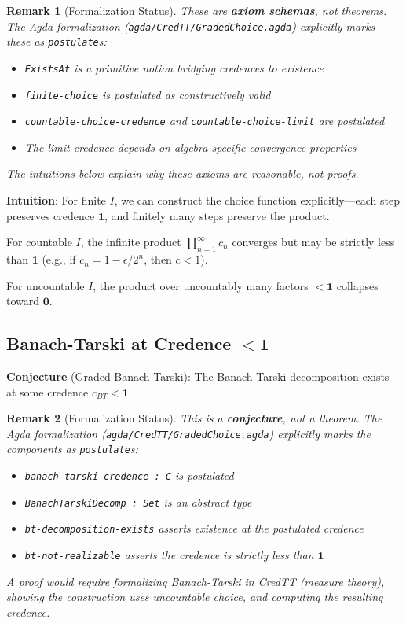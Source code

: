 \documentclass[11pt,a4paper]{article}
\newtheorem{remark}{Remark}[section]
\newcommand{\one}{\mathbf{1}}
\newcommand{\zero}{\mathbf{0}}
\begin{document}
\begin{remark}[Formalization Status]
These are \textbf{axiom schemas}, not theorems. The Agda formalization (\texttt{agda/CredTT/GradedChoice.agda}) explicitly marks these as \texttt{postulate}s:
\begin{itemize}
    \item \texttt{ExistsAt} is a primitive notion bridging credences to existence
    \item \texttt{finite-choice} is postulated as constructively valid
    \item \texttt{countable-choice-credence} and \texttt{countable-choice-limit} are postulated
    \item The limit credence depends on algebra-specific convergence properties
\end{itemize}
The intuitions below explain \emph{why} these axioms are reasonable, not proofs.
\end{remark}

\textbf{Intuition}:
For finite $I$, we can construct the choice function explicitly---each step preserves credence $\one$, and finitely many steps preserve the product.

For countable $I$, the infinite product $\prod_{n=1}^\infty c_n$ converges but may be strictly less than $\one$ (e.g., if $c_n = 1 - \epsilon/2^n$, then $c < 1$).

For uncountable $I$, the product over uncountably many factors $< \one$ collapses toward $\zero$.

\subsection{Banach-Tarski at Credence $< \one$}

\textbf{Conjecture} (Graded Banach-Tarski):
The Banach-Tarski decomposition exists at some credence $c_{BT} < \one$.

\begin{remark}[Formalization Status]
This is a \textbf{conjecture}, not a theorem. The Agda formalization (\texttt{agda/CredTT/GradedChoice.agda}) explicitly marks the components as \texttt{postulate}s:
\begin{itemize}
    \item \texttt{banach-tarski-credence : C} is postulated
    \item \texttt{BanachTarskiDecomp : Set} is an abstract type
    \item \texttt{bt-decomposition-exists} asserts existence at the postulated credence
    \item \texttt{bt-not-realizable} asserts the credence is strictly less than $\one$
\end{itemize}
A proof would require formalizing Banach-Tarski in CredTT (measure theory), showing the construction uses uncountable choice, and computing the resulting credence.
\end{remark}
\end{document}

